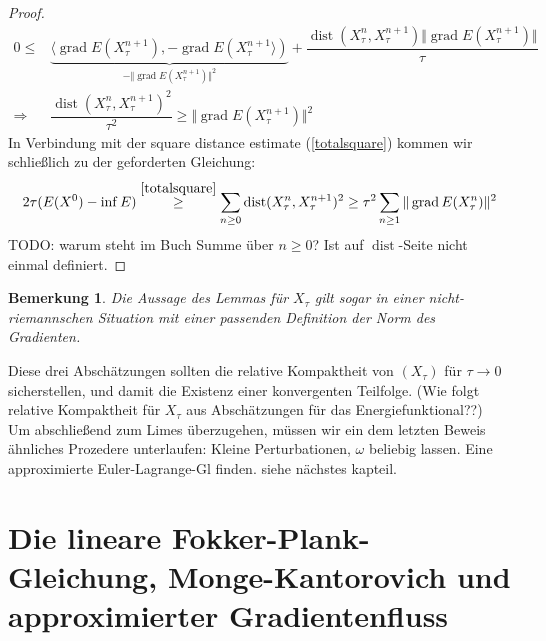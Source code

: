 \documentclass[11pt,a4paper,notitlepage]{scrreprt}
\newcommand{\dist}{\operatorname{dist}}
\newcommand{\grad}{\operatorname{grad}}
\newtheorem{bem}[defi]{Bemerkung}
\begin{document}
\begin{proof}
\begin{align*}
0\leq& \underset{-\Vert \grad E(X_\tau^{n+1}) \Vert^2}{\underbrace{\langle \grad E(X_\tau^{n+1}),-\grad E(X_\tau^{n+1}\rangle)}}+\dfrac{\dist(X_\tau^n,X_\tau^{n+1})\Vert \grad E(X_\tau^{n+1}) \Vert}{\tau}\\
\Rightarrow& \dfrac{\dist(X_\tau^n,X_\tau^{n+1})^2}{\tau^2} \geq \Vert \grad E(X_\tau^{n+1}) \Vert^2
\end{align*}
In Verbindung mit der square distance estimate (\ref{totalsquare}) kommen wir schließlich zu der geforderten Gleichung:
\begin{equation}
 2\tau (E(X^0)-\inf E)\overset{\ref{totalsquare}}\geq \sum_{n\geq 0} \dist(X_\tau^n,X_\tau^{n+1})^2 \geq \tau^2 \sum_{n\geq 1} \Vert \grad E(X_\tau^n)\Vert^2
\end{equation}
TODO: warum steht im Buch Summe über $n\geq 0$? Ist auf $\dist$-Seite nicht einmal definiert.
\end{proof}
\begin{bem}
Die Aussage des Lemmas für $X_\tau$ gilt sogar in einer nicht-riemannschen Situation mit einer passenden Definition der Norm des Gradienten. 
\end{bem}

Diese drei Abschätzungen sollten die relative Kompaktheit von $(X_\tau)$ für $\tau \to 0$ sicherstellen, und damit die Existenz einer konvergenten Teilfolge. (Wie folgt relative Kompaktheit für $X_\tau$ aus Abschätzungen für das Energiefunktional??) \\
Um abschließend zum Limes überzugehen, müssen wir ein dem letzten Beweis ähnliches Prozedere unterlaufen: Kleine Perturbationen, $\omega$ beliebig lassen. Eine approximierte Euler-Lagrange-Gl finden. siehe nächstes kapteil. 


\section{Die lineare Fokker-Plank-Gleichung, Monge-Kantorovich und approximierter Gradientenfluss}
\end{document}
